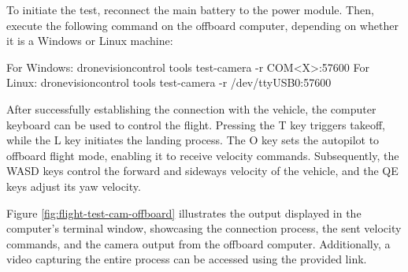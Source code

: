 To initiate the test, reconnect the main battery to the power module. Then, execute the following command on the offboard computer, depending on whether it is a Windows or Linux machine:

For Windows: dronevisioncontrol tools test-camera -r COM<X>:57600
For Linux: dronevisioncontrol tools test-camera -r /dev/ttyUSB0:57600

After successfully establishing the connection with the vehicle, the computer keyboard can be used to control the flight. Pressing the T key triggers takeoff, while the L key initiates the landing process. The O key sets the autopilot to offboard flight mode, enabling it to receive velocity commands. Subsequently, the WASD keys control the forward and sideways velocity of the vehicle, and the QE keys adjust its yaw velocity.

Figure \ref{fig:flight-test-cam-offboard} illustrates the output displayed in the computer's terminal window, showcasing the connection process, the sent velocity commands, and the camera output from the offboard computer. Additionally, a video capturing the entire process can be accessed using the provided link.

